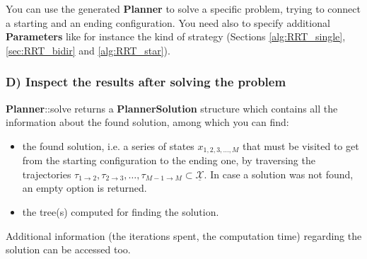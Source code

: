 You can use the generated \textbf{Planner} to solve a specific problem, trying to connect a starting and an ending configuration.
You need also to specify additional \textbf{Parameters} like for instance the kind of strategy (Sections \ref{alg:RRT_single}, \ref{sec:RRT_bidir} and \ref{alg:RRT_star}).

\subsubsection{D) Inspect the results after solving the problem}

\textbf{Planner}::solve returns a \textbf{PlannerSolution} structure which contains all the information about the found solution, among which you can find:
\begin{itemize}
\item the found solution, i.e. a series of states $x_{1,2,3,\hdots,M}$ that must be visited to get from the starting configuration to the ending one, by traversing the trajectories $\tau_{1 \rightarrow 2 } , \tau_{2 \rightarrow 3}, \hdots ,\tau_{M-1 \rightarrow M} \subset \underline{\mathcal{X}}$. In case a solution was not found, an empty option is returned.
\item the tree(s) computed for finding the solution.
\end{itemize}
Additional information (the iterations spent, the computation time) regarding the solution can be accessed too.

